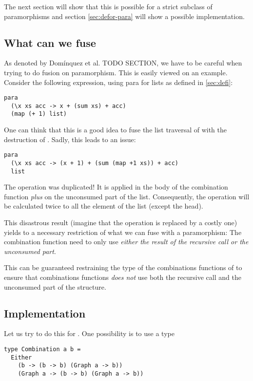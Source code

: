 The next section will show that this is possible for a strict subclass of paramorphisms and section \ref{sec:defor-para} will show a possible implementation.

\subsection{What can we fuse}

As denoted by Domínquez et al. \cite{paramorphismFusion} TODO SECTION, we have to be careful when trying to do fusion on paramorphism.
This is easily viewed on an example. Consider the following expression, using para for lists as defined in \ref{sec:defi}:
\begin{verbatim}
para
  (\x xs acc -> x + (sum xs) + acc)
  (map (+ 1) list)
\end{verbatim}

One can think that this is a good idea to fuse the list traversal of  with the destruction of . Sadly, this leads to an issue:

\begin{verbatim}
para
  (\x xs acc -> (x + 1) + (sum (map +1 xs)) + acc)
  list
\end{verbatim}

The  operation was duplicated! It is applied in the body of the combination function \emph{plus} on the unconsumed part of the list. Consequently, the  operation will be calculated twice to all the element of the list (except the head).

This disastrous result (imagine that the  operation is replaced by a costly one) yields to a necessary restriction of what we can fuse with a paramorphism:
The combination function need to only use \emph{either the result of the recursive call or the unconsumed part}.

This can be guaranteed restraining the type of the combinations functions of  to ensure that combinations functions \emph{does not} use both the recursive call and the unconsumed part of the structure.

\subsection{Implementation}

Let us try to do this for .
One possibility is to use a type
\begin{verbatim}
type Combination a b =
  Either
    (b -> (b -> b) (Graph a -> b))
    (Graph a -> (b -> b) (Graph a -> b))
\end{verbatim}

